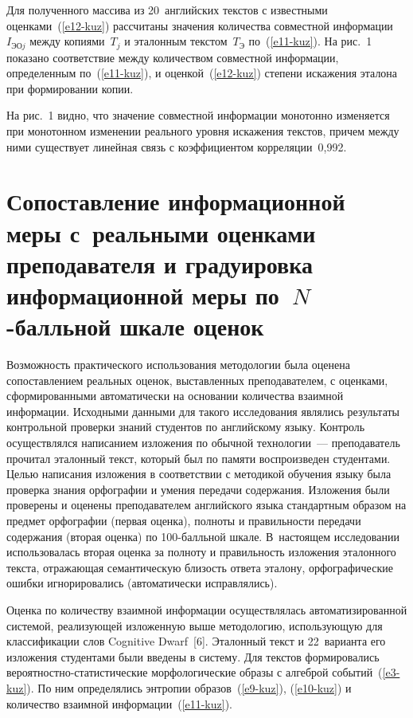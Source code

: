 \begin{multicols}{2}
     Для полученного массива из 20~английских текс\-тов с известными 
оценками~(\ref{e12-kuz}) рассчитаны значения количества совместной информации 
$I_{\mathrm{ЭО}j}$ между копиями~$T_j$ и эталонным текс\-том~$T_{\mathrm{Э}}$ 
по~(\ref{e11-kuz}). На рис.~1 показано соответствие между количеством совместной 
информации, определенным по~(\ref{e11-kuz}), и оценкой~(\ref{e12-kuz}) степени 
искажения эталона при формировании копии.



      На рис.~1 видно, что значение совместной информации монотонно 
изменяется при монотонном изменении реального уровня искажения текстов, 
причем между ними существует линейная связь с коэффициентом 
корреляции~0,992.
      
\section{Сопоставление информационной меры с~реальными оценками 
преподавателя и градуировка информационной меры по~$N$-балльной 
шкале оценок}
     
     Возможность практического использования методологии была оценена 
сопоставлением реальных оценок, выставленных преподавателем, с оценками, 
сформированными автоматически на основании количества взаимной информации. 
Исходными данными для такого исследования являлись результаты контрольной 
проверки знаний студентов по английскому языку. Контроль осуществлялся 
написанием изложения по обычной технологии~--- преподаватель прочитал 
эталонный текст, который был по памяти воспроизведен студентами. Целью 
написания изложения в соответствии с методикой обучения языку была проверка 
знания орфографии и умения передачи содержания. Изложения были проверены и 
оценены преподавателем английского языка стандартным образом на предмет 
орфографии (первая оценка), полноты и правильности передачи содержания (вторая 
оценка) по 100-балль\-ной шкале. В~настоящем исследовании использовалась 
вторая оценка за полноту и правильность изложения эталонного текста, 
отражающая семантическую близость ответа эталону, орфографические ошибки 
игнорировались (автоматически исправлялись). 
     
     Оценка по количеству взаимной информации осуществлялась 
автоматизированной системой, реализующей изложенную выше методологию, 
использующую для классификации слов Cognitive Dwarf~[6]. Эталонный текст и 
22~варианта его изложения студентами были введены в систему. Для текстов 
формировались ве\-ро\-ят\-ност\-но-ста\-ти\-сти\-че\-ские морфологические образы с 
алгеброй событий~(\ref{e3-kuz}). По ним определялись энтропии образов~(\ref{e9-kuz}), 
(\ref{e10-kuz}) и количество взаимной информации~(\ref{e11-kuz}). 
     

\end{multicols}
